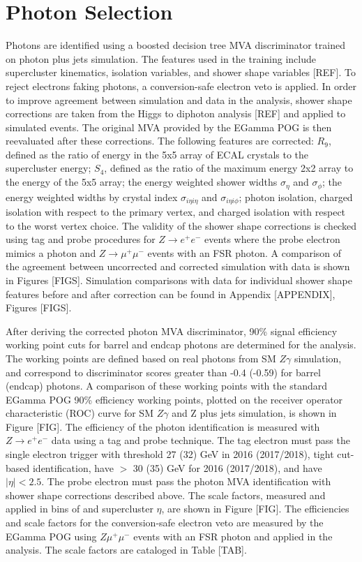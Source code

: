\section{Photon Selection}
Photons are identified using a boosted decision tree MVA discriminator trained on photon plus jets simulation. The features used in the 
training include supercluster kinematics, isolation variables, and shower shape variables [REF]. To reject electrons faking photons, 
a conversion-safe electron veto is applied. In order to improve agreement between simulation and data in the \hzg analysis, shower 
shape corrections are taken from the Higgs to diphoton analysis [REF] and applied to simulated events. The original MVA provided by the 
EGamma POG is then reevaluated after these corrections. The following features are corrected: $R_{9}$, defined as the ratio of energy in
the 5x5 array of ECAL crystals to the supercluster energy; $S_{4}$, defined as the ratio of the maximum energy 2x2 array to the energy of 
the 5x5 array; the energy weighted shower widths $\sigma_{\eta}$ and $\sigma_{\phi}$; the energy weighted widths by crystal index 
$\sigma_{i\eta i\eta}$ and $\sigma_{i\eta i\phi}$; photon isolation, charged isolation with respect to the primary vertex, 
and charged isolation with respect to the worst vertex choice. The validity of the shower shape corrections is checked using tag 
and probe procedures for $Z\rightarrow e^{+}e^{-}$ events where the probe electron mimics a photon and $Z\rightarrow \mu^{+}\mu^{-}$
events with an FSR photon. A comparison of the agreement between uncorrected and corrected simulation with data is shown in 
Figures [FIGS]. Simulation comparisons with data for individual shower shape features before and after correction can be found 
in Appendix [APPENDIX], Figures [FIGS]. 

After deriving the corrected photon MVA discriminator, 90\% signal efficiency working point cuts for barrel and endcap photons 
are determined for the \hzg analysis. The working points are defined based on real photons from SM $Z\gamma$ simulation, and correspond 
to discriminator scores greater than -0.4 (-0.59) for barrel (endcap) photons. A comparison of these working points with the standard 
EGamma POG 90\% efficiency working points, plotted on the receiver operator characteristic (ROC) curve for SM $Z\gamma$ and Z plus jets 
simulation, is shown in Figure [FIG]. The efficiency of the photon identification is measured with $Z\rightarrow e^{+}e^{-}$ data
using a tag and probe technique. The tag electron must pass the single electron trigger with \pT threshold 27 (32) GeV in 
2016 (2017/2018), tight cut-based identification, have \pT $>$ 30 (35) GeV for 2016 (2017/2018), and have $|\eta| < 2.5$. The 
probe electron must pass the photon MVA identification with shower shape corrections described above. The scale factors, measured and 
applied in bins of \pT and supercluster $\eta$, are shown in Figure [FIG]. The efficiencies and scale factors for the conversion-safe 
electron veto are measured by the EGamma POG using $Z\mu^{+}\mu^{-}$ events with an FSR photon and applied in the \hzg analysis. 
The scale factors are cataloged in Table [TAB]. 

